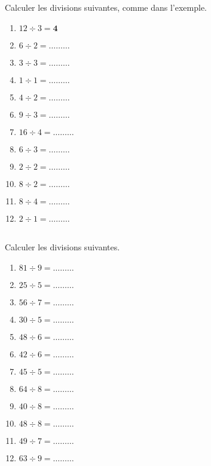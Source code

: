 





\phantom{0}\\
\exercice \diff[1] \\
Calculer les divisions suivantes, comme dans l'exemple.
\begin{multicols}{4}
\begin{enumerate}
\item $12 \div 3 = \textbf{4} $
\item $6 \div 2 = \ldots\ldots\ldots $
\item $3 \div 3 = \ldots\ldots\ldots $
\item $1 \div 1 = \ldots\ldots\ldots $
\item $4 \div 2 = \ldots\ldots\ldots $
\item $9 \div 3 = \ldots\ldots\ldots $
\item $16 \div 4 = \ldots\ldots\ldots $
\item $6 \div 3 = \ldots\ldots\ldots $
\item $2 \div 2 = \ldots\ldots\ldots $
\item $8 \div 2 = \ldots\ldots\ldots $
\item $8 \div 4 = \ldots\ldots\ldots $
\item $2 \div 1 = \ldots\ldots\ldots $
\end{enumerate}
\end{multicols}

\exercice \diff[2] \\
Calculer les divisions suivantes.
\begin{multicols}{4}
\begin{enumerate}
\item $81 \div 9 = \ldots\ldots\ldots $
\item $25 \div 5 = \ldots\ldots\ldots $
\item $56 \div 7 = \ldots\ldots\ldots $
\item $30 \div 5 = \ldots\ldots\ldots $
\item $48 \div 6 = \ldots\ldots\ldots $
\item $42 \div 6 = \ldots\ldots\ldots $
\item $45 \div 5 = \ldots\ldots\ldots $
\item $64 \div 8 = \ldots\ldots\ldots $
\item $40 \div 8 = \ldots\ldots\ldots $
\item $48 \div 8 = \ldots\ldots\ldots $
\item $49 \div 7 = \ldots\ldots\ldots $
\item $63 \div 9 = \ldots\ldots\ldots $
\end{enumerate}
\end{multicols}

